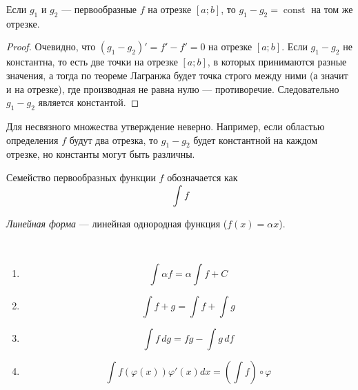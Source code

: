 \documentclass[12pt,a4paper]{article}
\DeclareMathOperator{\const}{const}
\begin{document}
    \begin{theorem}
        Если $g_1$ и $g_2$ --- первообразные $f$ на отрезке $[a; b]$, то $g_1 - g_2 = \const$ на том же отрезке.
    \end{theorem}

    \begin{proof}
        Очевидно, что $(g_1 - g_2)' = f' - f' = 0$ на отрезке $[a; b]$. Если $g_1 - g_2$ не константна, то есть две точки на отрезке $[a; b]$, в которых принимаются разные значения, а тогда по теореме Лагранжа будет точка строго между ними (а значит и на отрезке), где производная не равна нулю --- противоречие. Следовательно $g_1 - g_2$ является константой.
    \end{proof}

    \begin{remark}
        Для несвязного множества утверждение неверно. Например, если областью определения $f$ будут два отрезка, то $g_1 - g_2$ будет константной на каждом отрезке, но константы могут быть различны.
    \end{remark}

    \begin{definition}
        Семейство первообразных функции $f$ обозначается как
        \[\int f\]
    \end{definition}

    \begin{definition}
        \emph{Линейная форма} --- линейная однородная функция ($f(x) = \alpha x$).
    \end{definition}

    \begin{theorem}\ 
        \begin{multicols}{2}
            \begin{enumerate}
                \item \[\int \alpha f = \alpha\int f + C\]
                \item \[\int f + g = \int f + \int g\]
                \item \[\int f\, dg = fg - \int g\, df\]
                \item \[\int f(\varphi(x))\varphi'(x)dx = \left(\int f\right) \circ \varphi\]
            \end{enumerate}
        \end{multicols}
    \end{theorem}
\end{document}
